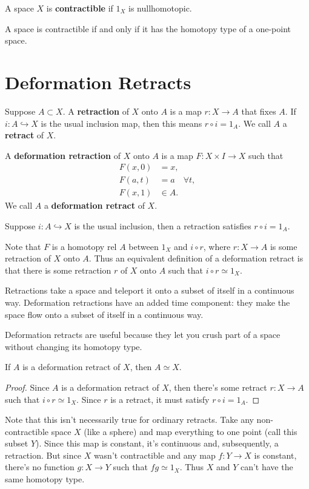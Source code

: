 \documentclass[twoside,10pt]{report}
\begin{document}
\begin{defn}[]
A space $X$ is \textbf{contractible} if $1_{X}$ is nullhomotopic.
\end{defn}

\begin{prop}
A space is contractible if and only if it has the homotopy type of a one-point space.
\end{prop}



\section{Deformation Retracts}

\begin{defn}[]
	Suppose $A \subset X$. A \textbf{retraction} of $X$ onto $A$ is a map $r:X\to A$ that fixes $A$. If $i:A\hookrightarrow X$ is the usual inclusion map, then this means $r\circ i = 1_{A}$. We call $A$ a \textbf{retract} of $X$.

	A \textbf{deformation retraction} of $X$ onto $A$ is a map $F:X\times I \to X$ such that
	\begin{align*}
		F(x,0)&=x,\\
		F(a,t)&=a \quad \forall t,\\
		F(x,1)&\in A.
	\end{align*}
	We call $A$ a \textbf{deformation retract} of $X$.
\end{defn}
Suppose $i:A\hookrightarrow X$ is the usual inclusion, then a retraction satisfies $r \circ i = 1_{A}$.

Note that $F$ is a homotopy rel $A$ between $1_{X}$ and $i \circ r$, where $r:X\to A$ is some retraction of $X$ onto $A$. Thus an equivalent definition of a deformation retract is that there is some retraction $r$ of $X$ onto $A$ such that $i \circ r \simeq 1_{X}$.

Retractions take a space and teleport it onto a subset of itself in a continuous way. Deformation retractions have an added time component: they make the space flow onto a subset of itself in a continuous way.

Deformation retracts are useful because they let you crush part of a space without changing its homotopy type.

\begin{prop}
	If $A$ is a deformation retract of $X$, then $A \simeq X$.
\end{prop}
\begin{proof}
	Since $A$ is a deformation retract of $X$, then there's some retract $r:X\to A$ such that $i \circ r \simeq 1_{X}$. Since $r$ is a retract, it must satisfy $r \circ i = 1_{A}$.
\end{proof}

Note that this isn't necessarily true for ordinary retracts. Take any non-contractible space $X$ (like a sphere) and map everything to one point (call this subset $Y$). Since this map is constant, it's continuous and, subsequently, a retraction. But since $X$ wasn't contractible and any map $f:Y\to X$ is constant, there's no function $g:X\to Y$ such that $fg \simeq 1_{X}$. Thus $X$ and $Y$ can't have the same homotopy type.
\end{document}
